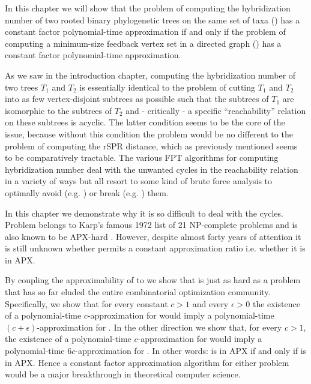 
In this chapter we will show that the problem of computing the hybridization number of two rooted binary phylogenetic trees on the same set of taxa (\mh) has a constant factor polynomial-time approximation if and only if the problem of computing a minimum-size feedback vertex set in a directed graph (\dfvs) has a constant factor polynomial-time approximation. 


As we saw in the introduction chapter, computing the hybridization number of two trees $T_1$ and $T_2$ is essentially identical to the problem of cutting $T_1$ and $T_2$ into as few vertex-disjoint subtrees as possible such that the subtrees of $T_1$ are isomorphic to the subtrees of $T_2$ and - critically - a specific ``reachability'' relation on these subtrees is acyclic. The latter condition seems to be the core of the issue, because without this condition the problem would be no different to the problem of computing the rSPR distance, which as previously mentioned seems to be comparatively tractable. %
The various FPT algorithms for computing hybridization number deal with the unwanted cycles in the reachability relation in a variety of ways but all resort to some kind of brute force analysis to optimally avoid (e.g. \cite{firststeps}) or break (e.g. \cite{hybridnet,whiddenFixed}) them.

In this chapter we demonstrate why it is so difficult to deal with the cycles. Problem \dfvs belongs to Karp's famous 1972 list of 21 NP-complete problems \cite{karp1972} and is also known to be APX-hard \cite{Kann}. However, despite almost forty years of attention it is still unknown whether \dfvs permits a constant approximation ratio i.e. whether it is in APX. %

By coupling the approximability of \mh to \dfvs we show that \mh is just as hard as a problem that has so far eluded the entire combinatorial optimization community. Specifically, we show that for every constant $c > 1$ and every $\epsilon > 0$ the existence of a polynomial-time $c$-approximation for \mh would imply a polynomial-time $(c + \epsilon)$-approximation for \dfvs. In the other direction we show that, for every $c > 1$, the existence of a polynomial-time $c$-approximation for \dfvs would imply a polynomial-time $6c$-approximation for \mh. In other words: \dfvs is in APX if and only if \mh is in APX. Hence a constant factor approximation algorithm for either problem would be a major breakthrough in theoretical computer science.


